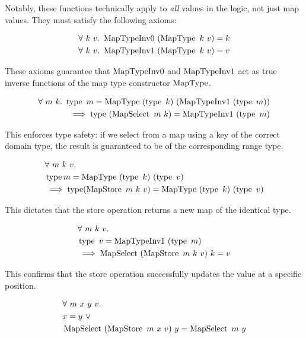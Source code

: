 Notably, these functions technically apply to \emph{all} values in the logic, not just map values.
They must satisfy the following axioms:

\begin{align*}
  & \forall\ k\ v.\ \operatorname{MapTypeInv0}\ (\operatorname{MapType}\ k\ v) = k\\
  & \forall\ k\ v.\ \operatorname{MapTypeInv1}\ (\operatorname{MapType}\ k\ v) = v
\end{align*}

These axioms guarantee that $\operatorname{MapTypeInv0}$ and $\operatorname{MapTypeInv1}$ act as true inverse functions of the map type constructor $\operatorname{MapType}$.

\begin{equation}
  \label{ax:map-select-typesafe}
  \begin{aligned}
    \forall \ m \ k. \ 
    \type \ m = \MapType \ (\type \ k) \ (\MapTypeInvV \ (\type \ m)) \\
    \implies  \type \ (\Select \ m \ k) = \MapTypeInvV \ (\type \ m)
  \end{aligned}
\end{equation}

This enforces type safety: if we select from a map using a key of the correct domain type,
the result is guaranteed to be of the corresponding range type.

\begin{align*}
  &\forall \ m \ k \ v. \\
  &\type m = \MapType\ (\type\ k)\ (\type\ v) \\
  &\implies  \type(\Store\ m\ k\ v) = \MapType\ (\type\ k)\ (\type\ v)
\end{align*}

This dictates that the store operation returns a new map of the identical type.

\begin{equation}
  \label{ax:map-update-strong}
  \begin{aligned}
    &\forall \ m \ k \ v.\\
    &\operatorname{type}\ v = \operatorname{MapTypeInv1}\ (\operatorname{type}\ m) \\
    &\implies  \operatorname{MapSelect}\ (\operatorname{MapStore}\ m\ k\ v)\ k = v
  \end{aligned}
\end{equation}

This confirms that the store operation successfully updates the value at a specific position.

\begin{align*}
  &\forall \ m \ x \ y \ v.\\
  &x = y \ \vee \\
  &\operatorname{MapSelect}\ (\operatorname{MapStore}\ m\ x\ v)\ y = \operatorname{MapSelect}\ m\ y
\end{align*}

